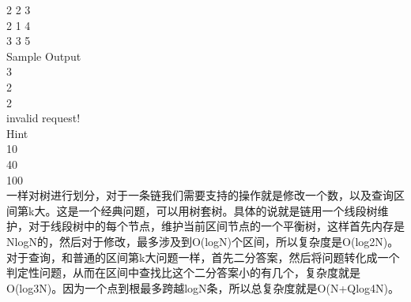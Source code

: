 2 2 3 \\
2 1 4 \\
3 3 5 \\
Sample Output \\
3 \\
2 \\
2 \\
invalid request! \\
Hint \\
10%
 \\
40%
 \\
100%
\\
一样对树进行划分，对于一条链我们需要支持的操作就是修改一个数，以及查询区间第k大。这是一个经典问题，可以用树套树。具体的说就是链用一个线段树维护，对于线段树中的每个节点，维护当前区间节点的一个平衡树，这样首先内存是NlogN的，然后对于修改，最多涉及到O(logN)个区间，所以复杂度是O(log2N)。对于查询，和普通的区间第k大问题一样，首先二分答案，然后将问题转化成一个判定性问题，从而在区间中查找比这个二分答案小的有几个，复杂度就是O(log3N)。因为一个点到根最多跨越logN条，所以总复杂度就是O(N+Qlog4N)。
